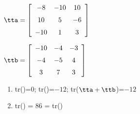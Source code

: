 {$\tta = \left[ \begin {array}{ccc} -8&-10&10\\\noalign{\medskip}10&5&-6
\\\noalign{\medskip}-10&1&3\end {array} \right]$

$\ttb = \left[ \begin {array}{ccc} -10&-4&-3\\\noalign{\medskip}-4&-5&4
\\\noalign{\medskip}3&7&3\end {array} \right]$
} 
{\begin{enumerate}
\item	tr(\tta)=0; tr(\ttb)=$-12$; tr($\tta+\ttb$)=$-12$
\item	tr(\tta\ttb) = 86 = tr(\ttb\tta)
\end{enumerate}
}



  

